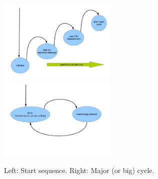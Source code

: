 \begin{figure}[ht]
	\includegraphics[width=0.5\textwidth]{figures/start.pdf}
	\includegraphics[width=0.5\textwidth]{figures/majorcycle.pdf}
	\caption{Left: Start sequence. Right: Major (or big) cycle.} \label{StartMajor}
\end{figure}

